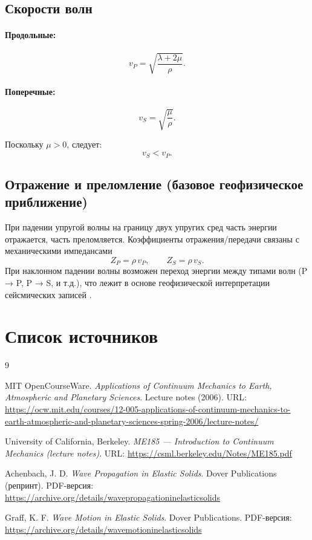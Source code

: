 \subsection{Скорости волн}

\paragraph{Продольные:}
\begin{equation}
v_P = \sqrt{\frac{\lambda + 2\mu}{\rho}}.
\end{equation}

\paragraph{Поперечные:}
\begin{equation}
v_S = \sqrt{\frac{\mu}{\rho}}.
\end{equation}

Поскольку $\mu > 0$, следует:
\[
v_S < v_P.
\]

\subsection{Отражение и преломление (базовое геофизическое приближение)}

При падении упругой волны на границу двух упругих сред часть энергии отражается, часть преломляется.  
Коэффициенты отражения/передачи связаны с механическими импедансами
\[
Z_P = \rho\, v_P,\qquad Z_S = \rho\, v_S.
\]
При наклонном падении волны возможен переход энергии между типами волн (P → P, P → S, и т.д.), что лежит в основе геофизической интерпретации сейсмических записей \cite{Achenbach, Berkeley_ME185}.



\section*{Список источников}

\begin{thebibliography}{9}

MIT OpenCourseWare. \textit{Applications of Continuum Mechanics to Earth, Atmospheric and Planetary Sciences}. Lecture notes (2006).  
URL: \url{https://ocw.mit.edu/courses/12-005-applications-of-continuum-mechanics-to-earth-atmospheric-and-planetary-sciences-spring-2006/lecture-notes/}

University of California, Berkeley. \textit{ME185 — Introduction to Continuum Mechanics (lecture notes)}.  
URL: \url{https://csml.berkeley.edu/Notes/ME185.pdf}

Achenbach, J. D. \textit{Wave Propagation in Elastic Solids}. Dover Publications (репринт).  
PDF-версия: \url{https://archive.org/details/wavepropagationinelasticsolids}

Graff, K. F. \textit{Wave Motion in Elastic Solids}. Dover Publications.  
PDF-версия: \url{https://archive.org/details/wavemotioninelasticsolids}

\end{thebibliography}
